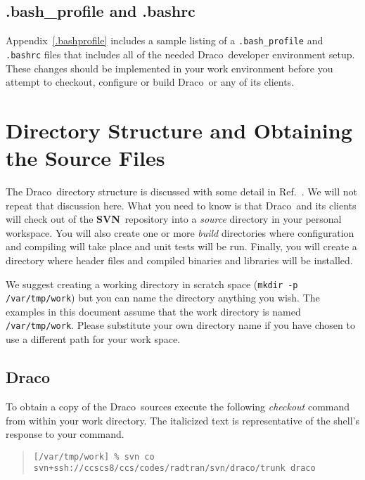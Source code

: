 \documentclass[11pt]{nmemo}
\newcommand{\comp}[1]{\normalfont\footnotesize\texttt{#1}\normalsize}
\newcommand{\draco}{{\normalfont\sffamily Draco}}
\newcommand{\svn}{{\normalfont\bfseries SVN}}
\begin{document}
\subsection{.bash\_profile and .bashrc}

Appendix~\ref{.bashprofile} includes a sample listing of a
\comp{.bash\_profile} and \comp{.bashrc} files that includes all of
the needed \draco\ developer environment setup.  These changes should
be implemented in your work environment before you attempt to
checkout, configure or build \draco\ or any of its clients.


\section{Directory Structure and Obtaining the Source Files}

The \draco\ directory structure is discussed with some detail in
Ref.~\cite{draco-build}.  We will not repeat that discussion here.
What you need to know is that \draco\ and its clients will check out
of the \svn\ repository into a \emph{source} directory in your
personal workspace.  You will also create one or more \emph{build}
directories where configuration and compiling will take place and unit
tests will be run.  Finally, you will create a directory where header
files and compiled binaries and libraries will be installed.

We suggest creating a working directory in scratch space (\comp{mkdir
  -p /var/tmp/work}) but you can name the directory anything you wish.
The examples in this document assume that the work directory is named
\comp{/var/tmp/work}.  Please substitute your own directory name if
you have chosen to use a different path for your work space.

\subsection{\draco}

To obtain a copy of the \draco\ sources execute the following
\emph{checkout} command from within your work directory.  The
italicized text is representative of the shell's response to your
command.

\footnotesize
\begin{verse}
\texttt{[/var/tmp/work] \% svn co svn+ssh://ccscs8/ccs/codes/radtran/svn/draco/trunk draco} \\
\end{verse}
\normalsize
\end{document}
